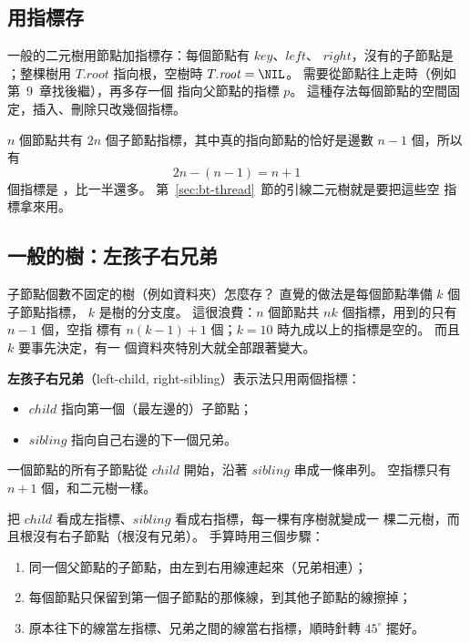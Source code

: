 \subsection{用指標存}
\label{sec:bt-linked}

一般的二元樹用節點加指標存：每個節點有 $\mathit{key}$、$\mathit{left}$、
$\mathit{right}$，沒有的子節點是 \NIL；整棵樹用 $T.\mathit{root}$ 指向根，空樹時
$T.\mathit{root} = \NIL$。 需要從節點往上走時（例如第~9~章找後繼），再多存一個
指向父節點的指標 $p$。 這種存法每個節點的空間固定，插入、刪除只改幾個指標。

$n$ 個節點共有 $2n$ 個子節點指標，其中真的指向節點的恰好是邊數 $n - 1$ 個，所以有
\[
2n - (n - 1) = n + 1
\]
個指標是 \NIL，比一半還多。 第~\ref{sec:bt-thread}~節的引線二元樹就是要把這些空
指標拿來用。

\subsection{一般的樹：左孩子右兄弟}
\label{sec:bt-lcrs}

子節點個數不固定的樹（例如資料夾）怎麼存？ 直覺的做法是每個節點準備 $k$ 個子節點指標，
$k$ 是樹的分支度。 這很浪費：$n$ 個節點共 $nk$ 個指標，用到的只有 $n - 1$ 個，空指
標有 $n(k - 1) + 1$ 個；$k = 10$ 時九成以上的指標是空的。 而且 $k$ 要事先決定，有一
個資料夾特別大就全部跟著變大。

\textbf{左孩子右兄弟}（left-child, right-sibling）表示法只用兩個指標：
\begin{itemize}
\item $\mathit{child}$ 指向第一個（最左邊的）子節點；
\item $\mathit{sibling}$ 指向自己右邊的下一個兄弟。
\end{itemize}
一個節點的所有子節點從 $\mathit{child}$ 開始，沿著 $\mathit{sibling}$ 串成一條串列。
空指標只有 $n + 1$ 個，和二元樹一樣。

把 $\mathit{child}$ 看成左指標、$\mathit{sibling}$ 看成右指標，每一棵有序樹就變成一
棵二元樹，而且根沒有右子節點（根沒有兄弟）。 手算時用三個步驟：
\begin{enumerate}
\item 同一個父節點的子節點，由左到右用線連起來（兄弟相連）；
\item 每個節點只保留到第一個子節點的那條線，到其他子節點的線擦掉；
\item 原本往下的線當左指標、兄弟之間的線當右指標，順時針轉 $45^\circ$ 擺好。
\end{enumerate}

